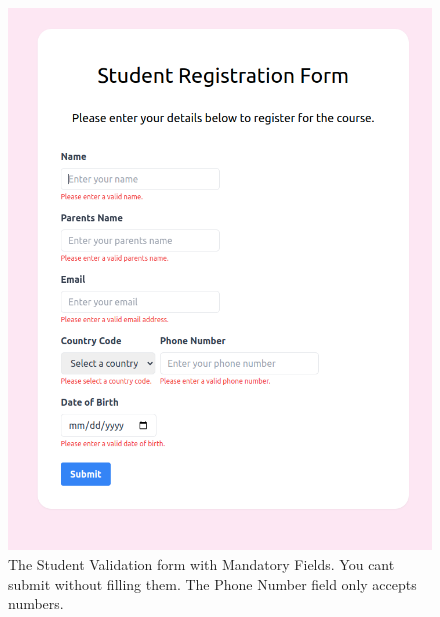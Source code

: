 \documentclass[11pt]{article}
\begin{document}
\begin{figure}[H]
    \centering
    \includegraphics[width=.95\textwidth]{02.png}
    \caption{The Student Validation form with Mandatory Fields. You cant submit without filling them. The Phone Number field only accepts numbers.}
\end{figure}
\end{document}

